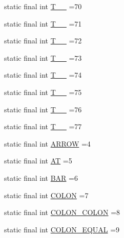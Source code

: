 \begin{DoxyCompactItemize}
\item 
static final int \hyperlink{classorg_1_1tzi_1_1use_1_1parser_1_1ocl_1_1_o_c_l_parser_a56597c4703928b6a4b44f4b3049e90f8}{T\-\_\-\-\_} =70
\item 
static final int \hyperlink{classorg_1_1tzi_1_1use_1_1parser_1_1ocl_1_1_o_c_l_parser_a80ee989c9fccdfe7476e707f9c9c6a08}{T\-\_\-\-\_} =71
\item 
static final int \hyperlink{classorg_1_1tzi_1_1use_1_1parser_1_1ocl_1_1_o_c_l_parser_a70bdc860bbc3b7316d4d300d128ec6dd}{T\-\_\-\-\_} =72
\item 
static final int \hyperlink{classorg_1_1tzi_1_1use_1_1parser_1_1ocl_1_1_o_c_l_parser_a0dbf1347e05a2599e93c4f6ba5d5b543}{T\-\_\-\-\_} =73
\item 
static final int \hyperlink{classorg_1_1tzi_1_1use_1_1parser_1_1ocl_1_1_o_c_l_parser_a24334d8e1847fe05520c3a7e0cca0774}{T\-\_\-\-\_} =74
\item 
static final int \hyperlink{classorg_1_1tzi_1_1use_1_1parser_1_1ocl_1_1_o_c_l_parser_a2887cd9d0977c44d4e4169ea408bede6}{T\-\_\-\-\_} =75
\item 
static final int \hyperlink{classorg_1_1tzi_1_1use_1_1parser_1_1ocl_1_1_o_c_l_parser_a2dcd2f82da46d28f072907622282d963}{T\-\_\-\-\_} =76
\item 
static final int \hyperlink{classorg_1_1tzi_1_1use_1_1parser_1_1ocl_1_1_o_c_l_parser_a7e775982b89d74ba30b3637c678f5967}{T\-\_\-\-\_} =77
\item 
static final int \hyperlink{classorg_1_1tzi_1_1use_1_1parser_1_1ocl_1_1_o_c_l_parser_a377ae48f0001156120b99cf3075e6fae}{A\-R\-R\-O\-W} =4
\item 
static final int \hyperlink{classorg_1_1tzi_1_1use_1_1parser_1_1ocl_1_1_o_c_l_parser_ad32711ad054927e0da6547905a7449fc}{A\-T} =5
\item 
static final int \hyperlink{classorg_1_1tzi_1_1use_1_1parser_1_1ocl_1_1_o_c_l_parser_a73088d692e111ac6e305451b87a405ad}{B\-A\-R} =6
\item 
static final int \hyperlink{classorg_1_1tzi_1_1use_1_1parser_1_1ocl_1_1_o_c_l_parser_a2716cdd358ea7b97c37eab8fa7bb247b}{C\-O\-L\-O\-N} =7
\item 
static final int \hyperlink{classorg_1_1tzi_1_1use_1_1parser_1_1ocl_1_1_o_c_l_parser_ad71402b7b2dda9c09724d473ce7778e1}{C\-O\-L\-O\-N\-\_\-\-C\-O\-L\-O\-N} =8
\item 
static final int \hyperlink{classorg_1_1tzi_1_1use_1_1parser_1_1ocl_1_1_o_c_l_parser_a8e4b59b16756895abc1f6c10c44539b2}{C\-O\-L\-O\-N\-\_\-\-E\-Q\-U\-A\-L} =9

\end{DoxyCompactItemize}
